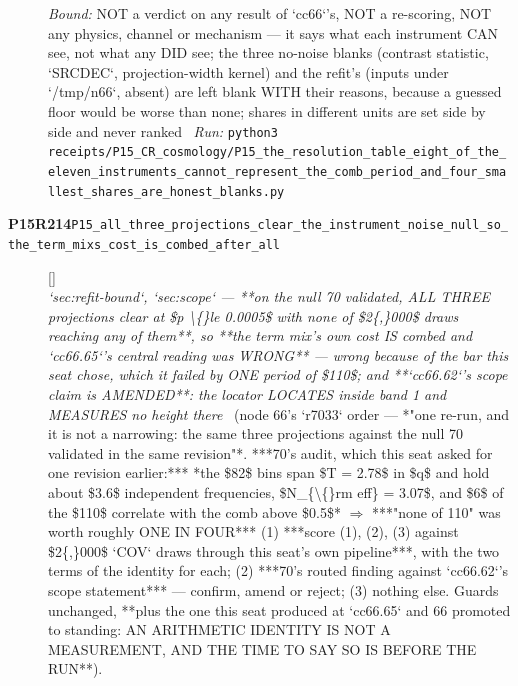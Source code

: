\begin{description}
 \emph{Bound:}  NOT a verdict on any result of `cc66`'s, NOT a re-scoring, NOT any physics, channel or mechanism --- it says what each instrument CAN see, not what any DID see; the three no-noise blanks (contrast statistic, `SRCDEC`, projection-width kernel) and the refit's (inputs under `/tmp/n66`, absent) are left blank WITH their reasons, because a guessed floor would be worse than none; shares in different units are set side by side and never ranked
\ \emph{Run:} \texttt{python3 receipts/P15\_CR\_cosmology/P15\_the\_resolution\_table\_eight\_of\_the\_eleven\_instruments\_cannot\_represent\_the\_comb\_period\_and\_four\_smallest\_shares\_are\_honest\_blanks.py}
\item[\rcptlabel{P15_all_three_projections_clear_the_instrument_noise_null_so_the_term_mixs_cost_is_combed_after_all}{P15R214}\textbf{P15R214}\quad\texttt{P15\_all\_three\_projections\_clear\_the\_instrument\_noise\_null\_so\_the\_term\_mixs\_cost\_is\_combed\_after\_all}]\hfill\textsf{[]}\\
\textit{`sec:refit-bound`, `sec:scope` --- **on the null 70 validated, ALL THREE projections clear at \$p \textbackslash\{\}le 0.0005\$ with none of \$2\{,\}000\$ draws reaching any of them**, so **the term mix's own cost IS combed and `cc66.65`'s central reading was WRONG** --- wrong because of the bar this seat chose, which it failed by ONE period of \$110\$; and **`cc66.62`'s scope claim is AMENDED**: the locator LOCATES inside band 1 and MEASURES no height there} \ (node 66's `r7033` order --- *"one re-run, and it is not a narrowing: the same three projections against the null 70 validated in the same revision"*.  ***70's audit, which this seat asked for one revision earlier:*** *the \$82\$ bins span \$T = 2.78\$ in \$q\$ and hold about \$3.6\$ independent frequencies, \$N\_\{\textbackslash\{\}rm eff\} = 3.07\$, and \$6\$ of the \$110\$ correlate with the comb above \$0.5\$* \ensuremath{\Rightarrow} ***"none of 110" was worth roughly ONE IN FOUR***  (1) ***score (1), (2), (3) against \$2\{,\}000\$ `COV` draws through this seat's own pipeline***, with the two terms of the identity for each; (2) ***70's routed finding against `cc66.62`'s scope statement*** --- confirm, amend or reject; (3) nothing else.  Guards unchanged, **plus the one this seat produced at `cc66.65` and 66 promoted to standing: AN ARITHMETIC IDENTITY IS NOT A MEASUREMENT, AND THE TIME TO SAY SO IS BEFORE THE RUN**). 

\end{description}
